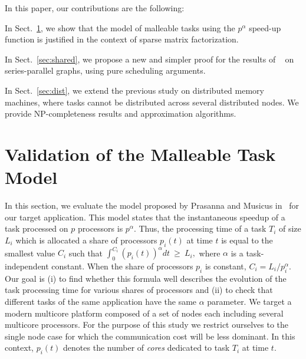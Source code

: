 \documentclass{llncs}
\begin{document}
In this paper, our contributions are the following:
\begin{compactitem}
\item In Sect.~\ref{sec:motiv}, we show that the model of malleable
  tasks using the $p^\alpha$ speed-up function is justified in the
  context of sparse matrix factorization.
\item In Sect.~\ref{sec:shared}, we propose a new and simpler proof
  for the results of ~\cite{prasmus,prasmus2} on series-parallel
  graphs, using pure scheduling arguments. 
\item In Sect.~\ref{sec:dist}, we extend the previous study on
  distributed memory machines, where tasks cannot be distributed
  across several distributed nodes. We provide NP-completeness
  results and approximation algorithms.
\end{compactitem}



\section{Validation of the Malleable Task Model}
\label{sec:motiv}

In this section, we evaluate the model proposed by
Prasanna and Musicus in~\cite{prasmus,prasmus2} for our target
application. This model states that the instantaneous speedup of a task processed on
$p$ processors is $p^\alpha$. Thus, the processing time of a task
$T_i$ of size $L_i$ which is allocated a share of processors $p_i(t)$
at time $t$ is equal to the smallest value $C_i$ such that
$
{ \int_{0}^{C_i} \left(p_i(t)\right)^{\alpha} dt} \ \geq\  L_i,
$
where $\alpha$ is a task-independent constant. When the share
of processors $p_i$ is constant, $C_i = L_i/p_i^\alpha$. Our goal is
(i) to find whether this formula well describes the evolution of the
task processing time for various shares of processors and (ii) to
check that different tasks of the same application have the same
$\alpha$ parameter.  We target a modern multicore platform composed of
a set of nodes each including several multicore processors. For the
purpose of this study we restrict ourselves to the single node case
for which the communication cost will be less dominant. In this
context, $p_i(t)$ denotes the number of \emph{cores} dedicated to task
$T_i$ at time $t$.
\end{document}
